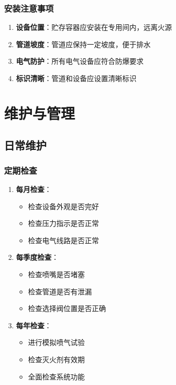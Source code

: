 \documentclass[12pt,UTF8]{ctexbook}
\begin{document}
\section{安装注意事项}

\begin{enumerate}
    \item \textbf{设备位置}：贮存容器应安装在专用间内，远离火源
    \item \textbf{管道坡度}：管道应保持一定坡度，便于排水
    \item \textbf{电气防护}：所有电气设备应符合防爆要求
    \item \textbf{标识清晰}：管道和设备应设置清晰标识
\end{enumerate}

\part{维护与管理}

\chapter{日常维护}

\section{定期检查}

\begin{enumerate}
    \item \textbf{每月检查}：
    \begin{itemize}[leftmargin=2em]
        \item 检查设备外观是否完好
        \item 检查压力指示是否正常
        \item 检查电气线路是否正常
    \end{itemize}
    
    \item \textbf{每季度检查}：
    \begin{itemize}[leftmargin=2em]
        \item 检查喷嘴是否堵塞
        \item 检查管道是否有泄漏
        \item 检查选择阀位置是否正确
    \end{itemize}
    
    \item \textbf{每年检查}：
    \begin{itemize}[leftmargin=2em]
        \item 进行模拟喷气试验
        \item 检查灭火剂有效期
        \item 全面检查系统功能
    \end{itemize}
\end{enumerate}
\end{document}
